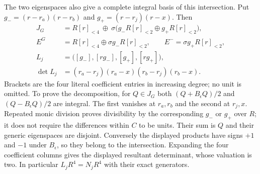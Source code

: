 The two eigenspaces also give a complete integral basis of this
intersection. Put $g_-=(r-r_a)(r-r_b)$ and
$g_+=(r-r_j)(r-x)$. Then
\[
\begin{aligned}
 J_G&=R[r]_{<4}\ \oplus\
  \sigma\bigl(g_-R[r]_{<2}\oplus g_+R[r]_{<2}\bigr),\\
 E^{G}&=R[r]_{<4}\oplus\sigma g_-R[r]_{<2},\qquad
 E^{-}=\sigma g_+R[r]_{<2},\\
 L_j&=\bigl([g_-],[rg_-],[g_+],[rg_+]\bigr),\\
 \det L_j&=(r_a-r_j)(r_a-x)(r_b-r_j)(r_b-x).
\end{aligned}                                                   \tag{SLF14}
\]
Brackets are the four literal coefficient entries in increasing
degree; no unit is omitted. To prove the decomposition, for
$Q\in J_G$ both $(Q+B_\epsilon Q)/2$ and
$(Q-B_\epsilon Q)/2$ are integral. The first vanishes at $r_a,r_b$
and the second at $r_j,x$. Repeated monic division proves divisibility
by the corresponding $g_-$ or $g_+$ over $R$; it does not require
the differences within $C$ to be units. Their sum is $Q$ and their
generic eigenspaces are disjoint. Conversely the displayed products
have signs $+1$ and $-1$ under $B_\epsilon$, so they belong to the
intersection. Expanding the four coefficient columns gives the
displayed resultant determinant, whose valuation is two.
In particular $L_jR^4=N_jR^4$ with their exact generators.

